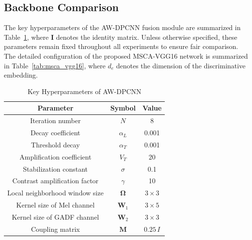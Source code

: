 \documentclass[anonymous]{iopjournal}
\begin{document}
\subsection{Backbone Comparison}
The key hyperparameters of the AW-DPCNN fusion module are summarized in Table~\ref{tab:awdpcnn_params}, where $\mathbf I$ denotes the identity matrix. Unless otherwise specified, these parameters remain fixed throughout all experiments to ensure fair comparison. The detailed configuration of the proposed MSCA-VGG16 network is summarized in Table~\ref{tab:msca_vgg16}, where $d_e$ denotes the dimension of the discriminative embedding.
\begin{table}
	\centering
	\caption{Key Hyperparameters of AW-DPCNN}
	\label{tab:awdpcnn_params}
	\begin{tabular}{ccc}
		\hline
		\textbf{Parameter} & \textbf{Symbol} & \textbf{Value} \\
		\hline
		Iteration number & $N$ & 8 \\
		Decay coefficient & $\alpha_L$ & 0.001 \\
		Threshold decay & $\alpha_T$ & 0.001 \\
		Amplification coefficient & $V_T$ & 20 \\
		Stabilization constant & $\sigma$ & 0.1 \\
		Contrast amplification factor & $\gamma$ & 10 \\
		Local neighborhood window size & $\boldsymbol{\Omega}$ & $3 \times 3$ \\
		Kernel size of Mel channel & $\boldsymbol{W}_1$ & $3 \times 5$ \\
		Kernel size of GADF channel & $\boldsymbol{W}_2$ & $3 \times 3$ \\
		Coupling matrix & $\boldsymbol{M}$ & $$0.25\,I$$ \\
		\hline
	\end{tabular}
\end{table}
\end{document}
